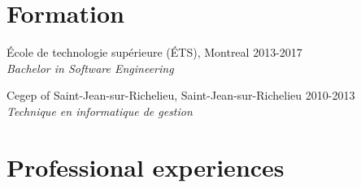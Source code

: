 \documentclass{res}
\newcommand{\inFrench}[1]{}
\newcommand{\inEnglish}[1]{#1}
\begin{document}
\begin{resume}
\section{Formation}
\vspace{6pt}

\inFrench{
	École de technologie supérieure (ÉTS), Montréal
	\hfill 2013-2017 \\
	{\sl Baccalauréat en génie logiciel}

	Cégep de Saint-Jean-sur-Richelieu, Saint-Jean-sur-Richelieu
	\hfill 2010-2013 \\
	{\sl Technique en informatique de gestion}
}
\inEnglish{
	École de technologie supérieure (ÉTS), Montreal
	\hfill 2013-2017 \\
	{\sl Bachelor in Software Engineering}

	Cegep of Saint-Jean-sur-Richelieu, Saint-Jean-sur-Richelieu
	\hfill 2010-2013 \\
	{\sl Technique en informatique de gestion}
}


\inFrench{
	\section{Expériences professionnelles}
}
\inEnglish{
	\section{Professional experiences}
}
\vspace{6pt}

\inFrench{
	Ericsson, Montréal\footnotemark
	\hfill mai à septembre 2016 \\
	{\sl Développeur Java} \hfill (Stage universitaire 3)
	\vspace{0.05in}

	\begin{itemize} \itemsep -2pt
		\item Ajout de fonctionnalités dans une API d'IPTV (Java);
		\item Création et amélioration d'utilitaires pour tests (Bash, JavaScript, Python et Perl);
		\item Développement d'une application de contrôle d'accès à base de rôles (RBAC) en Python;
		\item Fonctionnalités d'exportation et d'importation de données d'un serveur LDAP à des serveurs Linux.
	\end{itemize}

}
\end{resume}
\end{document}
